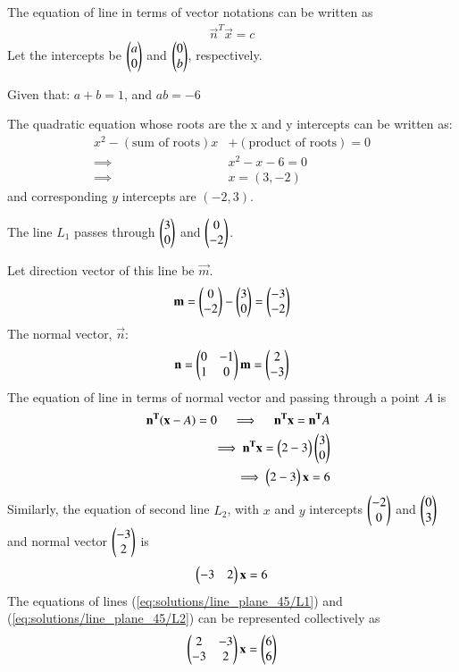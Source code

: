 	The equation of line in terms of vector notations can be written as
\begin{align}
	\vec{n}^T \vec{x} = c  
\end{align}
Let the intercepts be $\begin{pmatrix}a \\ 0\end{pmatrix}$ and $\begin{pmatrix}0 \\ b\end{pmatrix}$, respectively.

	Given that: \quad $ a + b = 1 $, \quad and \quad $ ab = -6$ 

The quadratic equation whose roots are the x and y intercepts can be written as:
\begin{align}
	x^2 - (\text{sum of roots})x &+ (\text{product of roots}) = 0 \\
	\implies \qquad & x^2 - x -6 =0 \\
	\implies \qquad & x=(3,-2) 
\end{align}
and corresponding $y$ intercepts are $(-2,3)$. 

The line $L_1$ passes through $\begin{pmatrix}3 \\ 0\end{pmatrix}$ and $\begin{pmatrix}0 \\ -2\end{pmatrix}$.

Let direction vector of this line be $\vec{m}$.
\begin{align}
	\mathbf{m} = \begin{pmatrix}0\\-2\end{pmatrix} - \begin{pmatrix}3\\0\end{pmatrix} = \begin{pmatrix}-3\\-2\end{pmatrix}
\end{align}
The normal vector, $\vec{n}$: 
\begin{align}
	{\mathbf{n}} = \begin{pmatrix}0 & -1 \\ 1 & 0\end{pmatrix}\mathbf{m} = \begin{pmatrix}2 \\ -3\end{pmatrix}
\end{align}
The equation of line in terms of normal vector and passing through a point $A$ 
	is
\begin{align}
	\quad \mathbf{n^T}(\mathbf{x} - A ) = 0
	\quad \implies \quad \mathbf{n^Tx} = \mathbf{n^T}A \\
	\implies \mathbf{n^Tx}= \begin{pmatrix}2 -3\end{pmatrix}\begin{pmatrix}3 \\ 0\end{pmatrix} \\
	\implies \begin{pmatrix}2 -3\end{pmatrix}\mathbf{x} = 6	\label{eq:solutions/line_plane_45/L1}
\end{align}
Similarly, the equation of second line $L_2$, with $x$ and 
	$y$ intercepts $\begin{pmatrix} -2 \\ 0\end{pmatrix}$ and $\begin{pmatrix} 0 \\ 3\end{pmatrix}$ and 
	normal vector $\begin{pmatrix} -3 \\ 2\end{pmatrix}$ is
\begin{align}
	\begin{pmatrix}-3 &  2 \end{pmatrix} {\mathbf{x}} = 6	\label{eq:solutions/line_plane_45/L2}
\end{align}
The equations of lines (\ref{eq:solutions/line_plane_45/L1}) and (\ref{eq:solutions/line_plane_45/L2}) can be represented 
	collectively as
\begin{align}
	\begin{pmatrix}2 & -3 \\ -3 & 2\end{pmatrix}\mathbf{x} = \begin{pmatrix}6 \\ 6\end{pmatrix}
\end{align}

